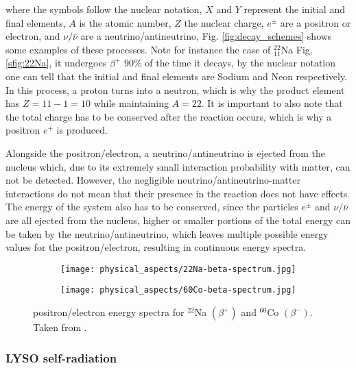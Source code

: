 where the symbols follow the nuclear notation, $X$ and $Y$ represent the initial and final elements, $A$ is the atomic number, $Z$ the nuclear charge, $e^{\pm}$ are a positron or electron, and $\nu/\bar{\nu}$ are a neutrino/antineutrino, Fig. \ref{fig:decay_schemes} shows some examples of these processes. Note for instance the case of $^{22}_{11}$Na Fig. \ref{sfig:22Na}, it undergoes $\beta^+$ $90\%$ of the time it decays, by the nuclear notation one can tell that the initial and final elements are Sodium and Neon respectively. In this process, a proton turns into a neutron, which is why the product element has $Z=11-1=10$ while maintaining $A=22$. It is important to also note that the total charge has to be conserved after the reaction occurs, which is why a positron $e^+$ is produced.

Alongside the positron/electron, a neutrino/antineutrino is ejected from the nucleus which, due to its extremely small interaction probability with matter, can not be detected. However, the negligible neutrino/antineutrino-matter interactions do not mean that their presence in the reaction does not have effects. The energy of the system also has to be conserved, since the particles $e^{\pm}$ and $\nu/\bar{\nu}$ are all ejected from the nucleus, higher or smaller portions of the total energy can be taken by the neutrino/antineutrino, which leaves multiple possible energy values for the positron/electron, resulting in continuous energy spectra.

\begin{figure}[H]
    \centering
    \begin{subfigure}[t]{0.45\textwidth}
      \texttt{[image: physical\_aspects/22Na-beta-spectrum.jpg]}
      \caption{\label{sfig:22Na_beta_spectra}}
    \end{subfigure}
    \begin{subfigure}[t]{0.45\textwidth}
      \texttt{[image: physical\_aspects/60Co-beta-spectrum.jpg]}
      \caption{\label{sfig:60Co_beta_spectra}}
    \end{subfigure}
    \caption{\label{fig:beta_spectra}positron/electron energy spectra for   $^{22}$Na $(\beta^+)$ and   $^{60}$Co $(\beta^-)$. Taken from \cite{IAEA}.}
\end{figure}

\subsubsection{LYSO self-radiation}\label{sec:self_radiation}

